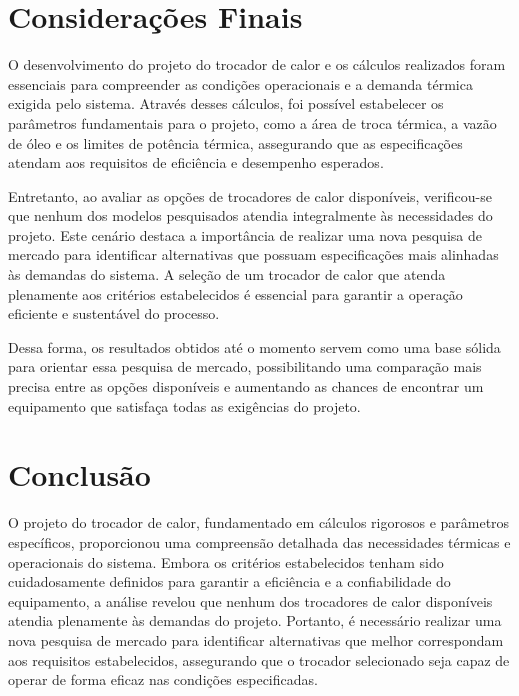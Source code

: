 \section{Considerações Finais}

O desenvolvimento do projeto do trocador de calor e os cálculos realizados foram essenciais para compreender as condições operacionais e a demanda térmica exigida pelo sistema. Através desses cálculos, foi possível estabelecer os parâmetros fundamentais para o projeto, como a área de troca térmica, a vazão de óleo e os limites de potência térmica, assegurando que as especificações atendam aos requisitos de eficiência e desempenho esperados.

Entretanto, ao avaliar as opções de trocadores de calor disponíveis, verificou-se que nenhum dos modelos pesquisados atendia integralmente às necessidades do projeto. Este cenário destaca a importância de realizar uma nova pesquisa de mercado para identificar alternativas que possuam especificações mais alinhadas às demandas do sistema. A seleção de um trocador de calor que atenda plenamente aos critérios estabelecidos é essencial para garantir a operação eficiente e sustentável do processo.

Dessa forma, os resultados obtidos até o momento servem como uma base sólida para orientar essa pesquisa de mercado, possibilitando uma comparação mais precisa entre as opções disponíveis e aumentando as chances de encontrar um equipamento que satisfaça todas as exigências do projeto.

\section{Conclusão}

O projeto do trocador de calor, fundamentado em cálculos rigorosos e parâmetros específicos, proporcionou uma compreensão detalhada das necessidades térmicas e operacionais do sistema. Embora os critérios estabelecidos tenham sido cuidadosamente definidos para garantir a eficiência e a confiabilidade do equipamento, a análise revelou que nenhum dos trocadores de calor disponíveis atendia plenamente às demandas do projeto. Portanto, é necessário realizar uma nova pesquisa de mercado para identificar alternativas que melhor correspondam aos requisitos estabelecidos, assegurando que o trocador selecionado seja capaz de operar de forma eficaz nas condições especificadas.
